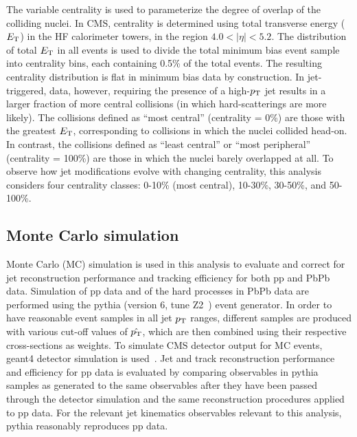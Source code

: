 The variable centrality is used to parameterize the degree of overlap of the colliding nuclei.  In CMS, centrality is determined using total transverse energy ($E_{\rm T}$) in the HF calorimeter towers, in the region $4.0 < |\eta| < 5.2$.  The distribution of total $E_{\rm T}$ in all events is used to divide the total minimum bias event sample into centrality bins, each containing 0.5\% of the total events.  The resulting centrality distribution is flat in minimum bias data by construction.  In jet-triggered, data, however, requiring the presence of a high-$p_{\rm T}$ jet results in a larger fraction of more central collisions (in which hard-scatterings are more likely).  The collisions defined as ``most central'' (centrality = 0\%) are those with the greatest $E_{\rm T}$, corresponding to collisions in which the nuclei collided head-on.  In contrast, the collisions defined as ``least central'' or ``most peripheral'' (centrality = 100\%) are those in which the nuclei barely overlapped at all.  To observe how jet modifications evolve with changing centrality, this analysis considers four centrality classes:  0-10\% (most central), 10-30\%, 30-50\%, and 50-100\%.

\subsection{Monte Carlo simulation}

Monte Carlo (MC) simulation is used in this analysis to evaluate and correct for jet reconstruction performance and tracking efficiency for both pp and PbPb data.  Simulation of pp data and of the hard processes in PbPb data are performed using the {\sc pythia} (version 6, tune Z2~\cite{bib_pythia}) event generator. In order to have reasonable event samples in all jet $p_{\rm T}$ ranges, different samples are produced with various cut-off values of $\hat{p_{\rm T}}$, which are then combined using their respective cross-sections as weights.  To simulate CMS detector output for MC events, {\sc geant}4 detector simulation is used~\cite{bib_geant}.  Jet and track reconstruction performance and efficiency for pp data is evaluated by comparing observables in {\sc pythia} samples as generated to the same observables after they have been passed through the detector simulation and the same reconstruction procedures applied to pp data.  For the relevant jet kinematics observables relevant to this analysis, {\sc pythia} reasonably reproduces pp data.  

